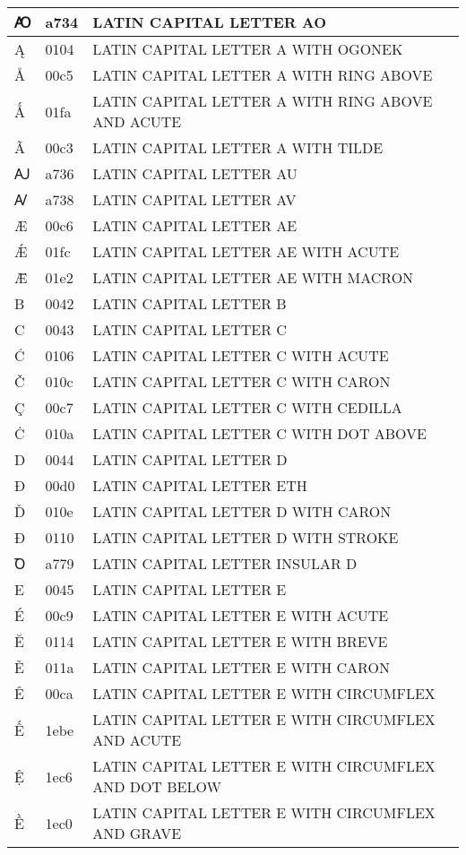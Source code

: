 \documentclass[12pt,letterpaper,openany]{book}
\begin{document}
\begin{center}
\begin{supertabular}{|m{0.25in}|m{0.5in}|m{4in}|}
Ꜵ & a734 & LATIN CAPITAL LETTER AO\\\hline
Ą & 0104 & LATIN CAPITAL LETTER A WITH OGONEK\\\hline
Å & 00c5 & LATIN CAPITAL LETTER A WITH RING ABOVE\\\hline
Ǻ & 01fa & LATIN CAPITAL LETTER A WITH RING ABOVE AND ACUTE\\\hline
Ã & 00c3 & LATIN CAPITAL LETTER A WITH TILDE\\\hline
Ꜷ & a736 & LATIN CAPITAL LETTER AU\\\hline
Ꜹ & a738 & LATIN CAPITAL LETTER AV\\\hline
Æ & 00c6 & LATIN CAPITAL LETTER AE\\\hline
Ǽ & 01fc & LATIN CAPITAL LETTER AE WITH ACUTE\\\hline
Ǣ & 01e2 & LATIN CAPITAL LETTER AE WITH MACRON\\\hline
B & 0042 & LATIN CAPITAL LETTER B\\\hline
C & 0043 & LATIN CAPITAL LETTER C\\\hline
Ć & 0106 & LATIN CAPITAL LETTER C WITH ACUTE\\\hline
Č & 010c & LATIN CAPITAL LETTER C WITH CARON\\\hline
Ç & 00c7 & LATIN CAPITAL LETTER C WITH CEDILLA\\\hline
Ċ & 010a & LATIN CAPITAL LETTER C WITH DOT ABOVE\\\hline
D & 0044 & LATIN CAPITAL LETTER D\\\hline
Ð & 00d0 & LATIN CAPITAL LETTER ETH\\\hline
Ď & 010e & LATIN CAPITAL LETTER D WITH CARON\\\hline
Đ & 0110 & LATIN CAPITAL LETTER D WITH STROKE\\\hline
Ꝺ & a779 & LATIN CAPITAL LETTER INSULAR D\\\hline
E & 0045 & LATIN CAPITAL LETTER E\\\hline
É & 00c9 & LATIN CAPITAL LETTER E WITH ACUTE\\\hline
Ĕ & 0114 & LATIN CAPITAL LETTER E WITH BREVE\\\hline
Ě & 011a & LATIN CAPITAL LETTER E WITH CARON\\\hline
Ê & 00ca & LATIN CAPITAL LETTER E WITH CIRCUMFLEX\\\hline
Ế & 1ebe & LATIN CAPITAL LETTER E WITH CIRCUMFLEX AND ACUTE\\\hline
Ệ & 1ec6 & \scriptsize LATIN CAPITAL LETTER E WITH CIRCUMFLEX AND DOT BELOW\\\hline
Ề & 1ec0 & LATIN CAPITAL LETTER E WITH CIRCUMFLEX AND GRAVE\\\hline

\end{supertabular}
\end{center}
\end{document}
